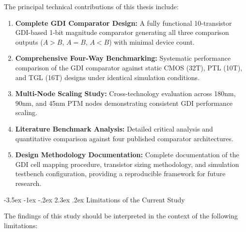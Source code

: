 \documentclass[12pt,a4paper,oneside]{report}
\makeatletter
\renewcommand\section{\@startsection {section}{1}{\z@}%
                                   {-3.5ex \@plus -1ex \@minus -.2ex}%
                                   {2.3ex \@plus.2ex}%
                                   {\normalfont\normalsize\bfseries}}
\makeatother
\begin{document}
The principal technical contributions of this thesis include:

\begin{enumerate}
\item \textbf{Complete GDI Comparator Design:} A fully functional 10-transistor GDI-based 1-bit magnitude comparator generating all three comparison outputs ($A>B$, $A=B$, $A<B$) with minimal device count.
\item \textbf{Comprehensive Four-Way Benchmarking:} Systematic performance comparison of the GDI comparator against static CMOS (32T), PTL (10T), and TGL (16T) designs under identical simulation conditions.
\item \textbf{Multi-Node Scaling Study:} Cross-technology evaluation across 180nm, 90nm, and 45nm PTM nodes demonstrating consistent GDI performance scaling.
\item \textbf{Literature Benchmark Analysis:} Detailed critical analysis and quantitative comparison against four published comparator architectures.
\item \textbf{Design Methodology Documentation:} Complete documentation of the GDI cell mapping procedure, transistor sizing methodology, and simulation testbench configuration, providing a reproducible framework for future research.
\end{enumerate}

\section{Limitations of the Current Study}

The findings of this study should be interpreted in the context of the following limitations:
\end{document}
